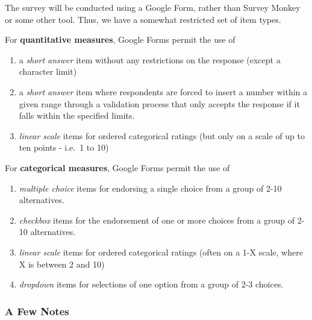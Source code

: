 \documentclass[]{book}
\providecommand{\tightlist}{%
  \setlength{\itemsep}{0pt}\setlength{\parskip}{0pt}}
\theoremstyle{definition}
\theoremstyle{definition}
\theoremstyle{definition}
\theoremstyle{remark}
\begin{document}
The survey will be conducted using a Google Form, rather than Survey
Monkey or some other tool. Thus, we have a somewhat restricted set of
item types.

For \textbf{quantitative measures}, Google Forms permit the use of

\begin{enumerate}
\def\labelenumi{\arabic{enumi}.}
\tightlist
\item
  a \emph{short answer} item without any restrictions on the response
  (except a character limit)
\item
  a \emph{short answer} item where respondents are forced to insert a
  number within a given range through a validation process that only
  accepts the response if it falls within the specified limits.
\item
  \emph{linear scale} items for ordered categorical ratings (but only on
  a scale of up to ten points - i.e.~1 to 10)
\end{enumerate}

For \textbf{categorical measures}, Google Forms permit the use of

\begin{enumerate}
\def\labelenumi{\arabic{enumi}.}
\tightlist
\item
  \emph{multiple choice} items for endorsing a single choice from a
  group of 2-10 alternatives.
\item
  \emph{checkbox} items for the endorsement of one or more choices from
  a group of 2-10 alternatives.
\item
  \emph{linear scale} items for ordered categorical ratings (often on a
  1-X scale, where X is between 2 and 10)
\item
  \emph{dropdown} items for selections of one option from a group of 2-3
  choices.
\end{enumerate}

\hypertarget{a-few-notes}{%
\subsubsection{A Few Notes}\label{a-few-notes}}
\end{document}
